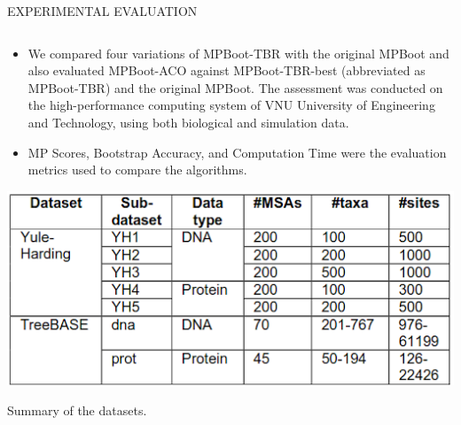 \documentclass[%
  final,%
  english,%
]{beamer}
\begin{document}
\begin{frame}[t, fragile = singleslide]
\begin{columns}[t, onlytextwidth]
\begin{column}{\textwidth}
\begin{block}{EXPERIMENTAL EVALUATION}
\begin{columns}
\begin{column}{0.48\textwidth}
\begin{itemize}
\item We compared four variations of MPBoot-TBR with the original MPBoot and also evaluated MPBoot-ACO against MPBoot-TBR-best (abbreviated as MPBoot-TBR) and the original MPBoot. The assessment was conducted on the high-performance computing system of VNU University of Engineering and Technology, using both biological and simulation data.
    \item MP Scores, Bootstrap Accuracy, and Computation Time were the evaluation metrics used to compare the algorithms.
\end{itemize}
\vspace{0.05cm}
\begin{table}
\centering%
\includegraphics[width = 0.65\columnwidth]{./Figuras/datasets.png}
\caption{Summary of the datasets.}
\end{table}


\end{column}
\end{columns}
\end{block}
\end{column}
\end{columns}
\end{frame}
\end{document}
